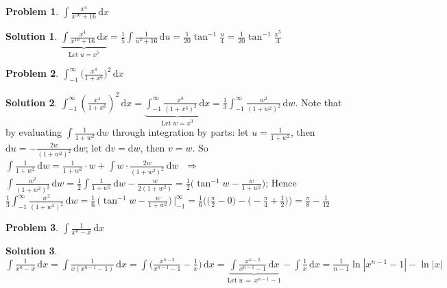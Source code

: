 \documentclass[11pt,a4paper]{article}
\newcommand{\ds}{\displaystyle}
\newcommand{\ie}{\;\Longrightarrow\;}
\theoremstyle{definition}
\newtheorem*{problem}{Problem}
\newtheorem*{solution}{Solution}
\begin{document}
\begin{problem}
  $\ds\int\!\frac{x^4}{x^{10}+16}\,\text{d}x$
\end{problem}

\begin{solution}
  $\ds\underbrace{\int\!\frac{x^4}{x^{10}+16}\,\text{d}x}_{\text{Let}\; u = x^5} = \frac{1}{5}\int\!\frac{1}{u^2 + 16}\,\text{d}u = \frac{1}{20}\tan^{-1}\frac{u}{4} = \frac{1}{20}\tan^{-1}\frac{x^5}{4}$
\end{solution}

\begin{problem}
  $\ds\int_{-1}^\infty\!\bigg(\frac{x^4}{1 + x^6}\bigg)^2\,\text{d}x$
\end{problem}

\begin{solution}
  $\ds\int_{-1}^\infty\!\left(\frac{x^4}{1 + x^6}\right)^2\,\text{d}x = \underbrace{\int_{-1}^\infty\!\frac{x^8}{(1 + x^6)^2}\,\text{d}x}_{\text{Let}\; w = x^3} = \frac{1}{3}\int_{-1}^\infty\!\frac{w^2}{(1 + w^2)^2}\,\text{d}w$. Note that by evaluating $\ds\int\!\frac{1}{1 + w^2}\,\text{d}w$ through integration by parts: let $\ds u = \frac{1}{1 + w^2}$, then $\ds\text{d}u = -\frac{2w}{(1 + w^2)^2}\,\text{d}w$; let $\ds\text{d}v = \text{d}w$, then $v = w$. So $\ds\int\!\frac{1}{1 + w^2}\,\text{d}w = \frac{1}{1 + w^2}\cdot w + \int\! w\cdot\frac{2w}{(1 + w^2)^2}\,\text{d}w$ $\ie$ $\ds\int\!\frac{w^2}{(1 + w^2)^2}\,\text{d}w = \frac{1}{2}\int\!\frac{1}{1 + w^2}\,\text{d}w - \frac{w}{2(1 + w^2)} = \frac{1}{2}\Big(\tan^{-1}w - \frac{w}{1 + w^2}\Big)$; Hence $\ds\frac{1}{3}\int_{-1}^\infty\!\frac{w^2}{(1 + w^2)^2}\,\text{d}w = \frac{1}{6}\,\Big(\tan^{-1}w - \frac{w}{1 + w^2}\Big)\,\bigg|_{-1}^\infty = \frac{1}{6}\bigg(\Big(\frac{\pi}{2} - 0\Big) - \Big(-\frac{\pi}{4} + \frac{1}{2}\Big)\bigg) = \frac{\pi}{8} - \frac{1}{12}$ 
\end{solution}

\begin{problem}
  $\ds\int\!\frac{1}{x^n - x}\,\text{d}x$
\end{problem}

\begin{solution}
$\ds\int\!\frac{1}{x^n - x}\,\text{d}x = \int\!\frac{1}{x(x^{n - 1} - 1)}\,\text{d}x = \int\!\bigg(\frac{x^{n - 2}}{x^{n - 1} - 1} - \frac{1}{x}\bigg)\,\text{d}x = \underbrace{\int\!\frac{x^{n - 2}}{x^{n - 1} - 1}\,\text{d}x}_{\text{Let}\; u\,=\,x^{n - 1} - 1} - \int\frac{1}{x}\,\text{d}x = \frac{1}{n - 1}\ln|x^{n - 1} - 1| - \ln|x|$
\end{solution}
\end{document}
